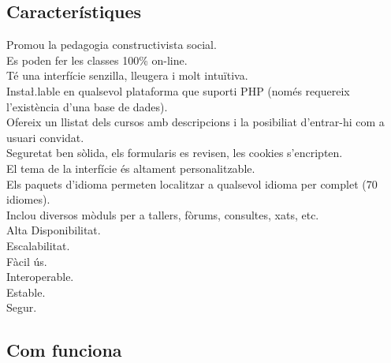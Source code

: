 \documentclass[a4paper]{report}  %
\begin{document}
\subsection{Característiques}
Promou la pedagogia constructivista social.\\
Es poden fer les classes 100\% on-line.\\
Té una interfície senzilla, lleugera i molt intuïtiva.\\
Insta\l.lable en qualsevol plataforma que suporti PHP (només requereix l'existència d'una base de dades).\\
Ofereix un llistat dels cursos amb descripcions i la posibiliat d'entrar-hi com a usuari convidat.\\
Seguretat ben sòlida, els formularis es revisen, les cookies s'encripten.\\
El tema de la interfície és altament personalitzable.\\
Els paquets d'idioma permeten localitzar a qualsevol idioma per complet (70 idiomes).\\
Inclou diversos mòduls per a tallers, fòrums, consultes, xats, etc.\\
Alta Disponibilitat.\\
Escalabilitat.\\
Fàcil ús.\\
Interoperable.\\
Estable.\\
Segur.\\
\subsection{Com funciona}
\end{document}
